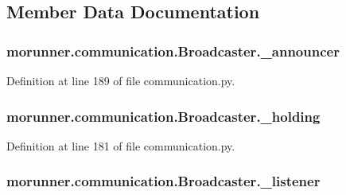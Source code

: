 \subsection{Member Data Documentation}
\hypertarget{classmorunner_1_1communication_1_1Broadcaster_a97538f8b7d411305f21fa5e5f475fbf8}{}
\subsubsection[{\+\_\+announcer}]{\setlength{\rightskip}{0pt plus 5cm}morunner.\+communication.\+Broadcaster.\+\_\+announcer\hspace{0.3cm}{\ttfamily [private]}}\label{classmorunner_1_1communication_1_1Broadcaster_a97538f8b7d411305f21fa5e5f475fbf8}


Definition at line 189 of file communication.\+py.

\hypertarget{classmorunner_1_1communication_1_1Broadcaster_a5c47bd16e024f775a6a690e7127a7151}{}
\subsubsection[{\+\_\+holding}]{\setlength{\rightskip}{0pt plus 5cm}morunner.\+communication.\+Broadcaster.\+\_\+holding\hspace{0.3cm}{\ttfamily [private]}}\label{classmorunner_1_1communication_1_1Broadcaster_a5c47bd16e024f775a6a690e7127a7151}


Definition at line 181 of file communication.\+py.

\hypertarget{classmorunner_1_1communication_1_1Broadcaster_aef0a924920a790ba2380db4d2b93e210}{}
\subsubsection[{\+\_\+listener}]{\setlength{\rightskip}{0pt plus 5cm}morunner.\+communication.\+Broadcaster.\+\_\+listener\hspace{0.3cm}{\ttfamily [private]}}\label{classmorunner_1_1communication_1_1Broadcaster_aef0a924920a790ba2380db4d2b93e210}


